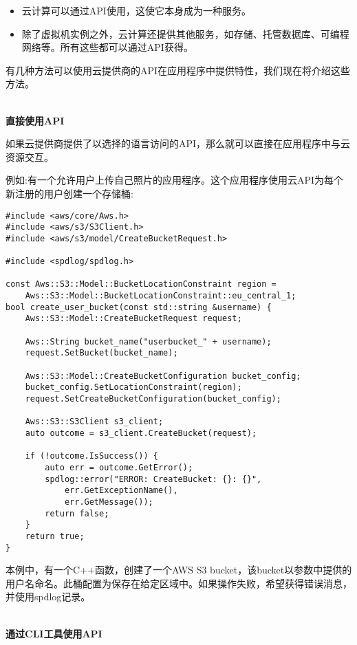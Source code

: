 \begin{itemize}
\item 
云计算可以通过API使用，这使它本身成为一种服务。

\item 
除了虚拟机实例之外，云计算还提供其他服务，如存储、托管数据库、可编程网络等。所有这些都可以通过API获得。
\end{itemize}

有几种方法可以使用云提供商的API在应用程序中提供特性，我们现在将介绍这些方法。

\hspace*{\fill} \\ %
\noindent
\textbf{直接使用API}

如果云提供商提供了以选择的语言访问的API，那么就可以直接在应用程序中与云资源交互。

例如:有一个允许用户上传自己照片的应用程序。这个应用程序使用云API为每个新注册的用户创建一个存储桶:

\begin{lstlisting}[style=styleCXX]
#include <aws/core/Aws.h>
#include <aws/s3/S3Client.h>
#include <aws/s3/model/CreateBucketRequest.h>

#include <spdlog/spdlog.h>

const Aws::S3::Model::BucketLocationConstraint region =
	Aws::S3::Model::BucketLocationConstraint::eu_central_1;
bool create_user_bucket(const std::string &username) {
	Aws::S3::Model::CreateBucketRequest request;
	
	Aws::String bucket_name("userbucket_" + username);
	request.SetBucket(bucket_name);
	
	Aws::S3::Model::CreateBucketConfiguration bucket_config;
	bucket_config.SetLocationConstraint(region);
	request.SetCreateBucketConfiguration(bucket_config);
	
	Aws::S3::S3Client s3_client;
	auto outcome = s3_client.CreateBucket(request);
	
	if (!outcome.IsSuccess()) {
		auto err = outcome.GetError();
		spdlog::error("ERROR: CreateBucket: {}: {}",
			err.GetExceptionName(),
			err.GetMessage());
		return false;
	}
	return true;
}
\end{lstlisting}

本例中，有一个C++函数，创建了一个AWS S3 bucket，该bucket以参数中提供的用户名命名。此桶配置为保存在给定区域中。如果操作失败，希望获得错误消息，并使用spdlog记录。

\hspace*{\fill} \\ %
\noindent
\textbf{通过CLI工具使用API}

